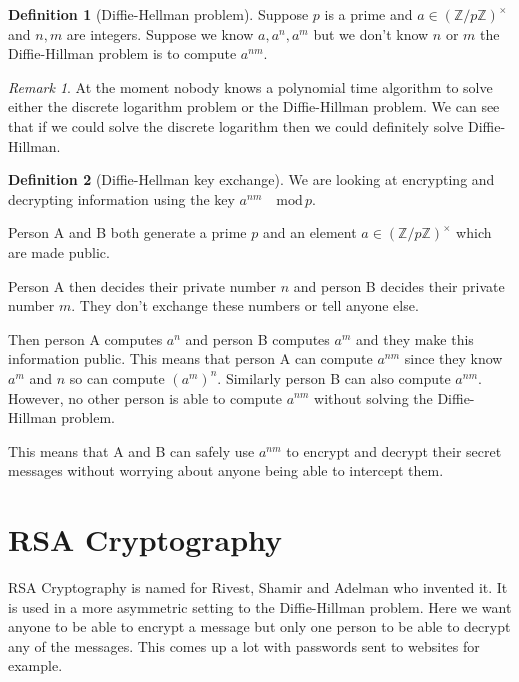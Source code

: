 \documentclass[
]{book}
\theoremstyle{definition}
\newtheorem{definition}{Definition}[chapter]
\theoremstyle{definition}
\theoremstyle{definition}
\theoremstyle{definition}
\theoremstyle{remark}
\newtheorem*{remark}{Remark}
\begin{document}
\begin{definition}[Diffie-Hellman problem]
Suppose \(p\) is a prime and \(a \in \left(\mathbb{Z}/p\mathbb{Z} \right)^{\times}\) and \(n, m\) are integers. Suppose we know \(a, a^n, a^m\) but we don't know \(n\) or \(m\) the Diffie-Hillman problem is to compute \(a^{nm}\).
\end{definition}

\begin{remark}
At the moment nobody knows a polynomial time algorithm to solve either the discrete logarithm problem or the Diffie-Hillman problem. We can see that if we could solve the discrete logarithm then we could definitely solve Diffie-Hillman.
\end{remark}

\begin{definition}[Diffie-Hellman key exchange]
We are looking at encrypting and decrypting information using the key \(a^{nm} \quad \mbox{mod} \, p\).

Person A and B both generate a prime \(p\) and an element \(a \in \left(\mathbb{Z}/p\mathbb{Z} \right)^{\times}\) which are made public.

Person A then decides their private number \(n\) and person B decides their private number \(m\). They don't exchange these numbers or tell anyone else.

Then person A computes \(a^n\) and person B computes \(a^m\) and they make this information public. This means that person A can compute \(a^{nm}\) since they know \(a^m\) and \(n\) so can compute \((a^m)^n\). Similarly person B can also compute \(a^{nm}\). However, no other person is able to compute \(a^{nm}\) without solving the Diffie-Hillman problem.

This means that A and B can safely use \(a^{nm}\) to encrypt and decrypt their secret messages without worrying about anyone being able to intercept them.
\end{definition}

\section{RSA Cryptography}\label{rsa-cryptography}

RSA Cryptography is named for Rivest, Shamir and Adelman who invented it. It is used in a more asymmetric setting to the Diffie-Hillman problem. Here we want anyone to be able to encrypt a message but only one person to be able to decrypt any of the messages. This comes up a lot with passwords sent to websites for example.
\end{document}
